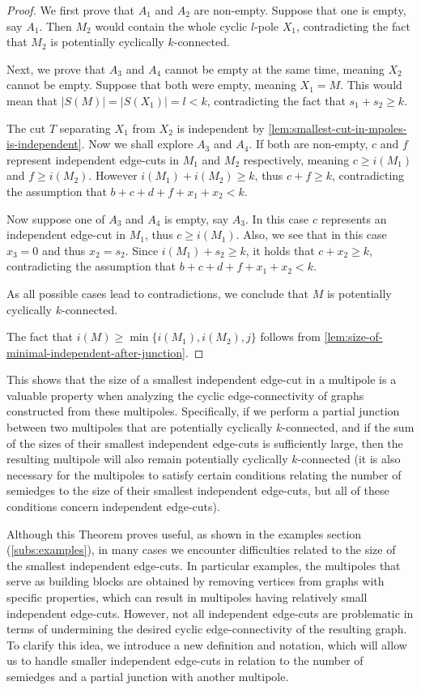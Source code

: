 \documentclass[12pt, twoside]{book}
\begin{document}
\begin{proof}
	We first prove that $A_1$ and $A_2$ are non-empty. Suppose that one is empty, say $A_1$. Then $M_2$ would contain the whole cyclic $l$-pole $X_1$, contradicting the fact that $M_2$ is potentially cyclically $k$-connected.
	
	Next, we prove that $A_3$ and $A_4$ cannot be empty at the same time, meaning $X_2$ cannot be empty. Suppose that both were empty, meaning $X_1=M$. This would mean that $|S(M)|=|S(X_1)|=l<k$, contradicting the fact that $s_1+s_2\geq k$.
	
	The cut $T$ separating $X_1$ from $X_2$ is independent by \cref{lem:smallest-cut-in-mpoles-is-independent}. Now we shall explore $A_3$ and $A_4$. If both are non-empty, $c$ and $f$ represent independent edge-cuts in $M_1$ and $M_2$ respectively, meaning ${c\geq i(M_1)}$ and ${f\geq i(M_2)}$. However ${i(M_1)+i(M_2)\geq k}$, thus $c+f\geq k$, contradicting the assumption that ${b+c+d+f+x_1+x_2<k}$.
	
	Now suppose one of $A_3$ and $A_4$ is empty, say $A_3$. In this case $c$ represents an independent edge-cut in $M_1$, thus $c\geq i(M_1)$. Also, we see that in this case $x_3=0$ and thus $x_2=s_2$. Since $i(M_1)+s_2\geq k$, it holds that $c+x_2\geq k$, contradicting the assumption that ${b+c+d+f+x_1+x_2<k}$.
	
	As all possible cases lead to contradictions, we conclude that $M$ is potentially cyclically \mbox{$k$-connected}.
	
	The fact that ${i(M)\geq \min\{i(M_1), i(M_2), j\}}$ follows from \cref{lem:size-of-minimal-independent-after-junction}.
\end{proof}

This shows that the size of a smallest independent edge-cut in a multipole is a valuable property when analyzing the cyclic edge-connectivity of graphs constructed from these multipoles. Specifically, if we perform a partial junction between two multipoles that are potentially cyclically $k$-connected, and if the sum of the sizes of their smallest independent edge-cuts is sufficiently large, then the resulting multipole will also remain potentially cyclically $k$-connected (it is also necessary for the multipoles to satisfy certain conditions relating the number of semiedges to the size of their smallest independent edge-cuts, but all of these conditions concern independent edge-cuts).

Although this Theorem proves useful, as shown in the examples section (\cref{subs:examples}), in many cases we encounter difficulties related to the size of the smallest independent edge-cuts. In particular examples, the multipoles that serve as building blocks are obtained by removing vertices from graphs with specific properties, which can result in multipoles having relatively small independent edge-cuts. However, not all independent edge-cuts are problematic in terms of undermining the desired cyclic edge-connectivity of the resulting graph. To clarify this idea, we introduce a new definition and notation, which will allow us to handle smaller independent edge-cuts in relation to the number of semiedges and a partial junction with another multipole.
\end{document}
